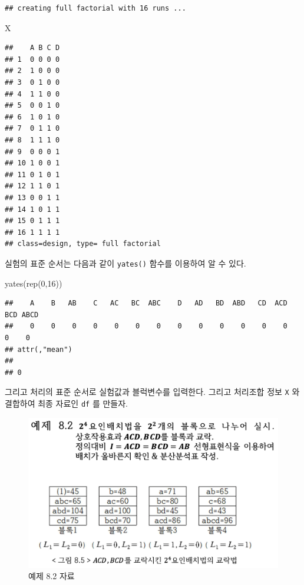 \documentclass[
]{book}
\newenvironment{Shaded}{\begin{snugshade}}{\end{snugshade}}
\newcommand{\DecValTok}[1]{\textcolor[rgb]{0.00,0.00,0.81}{#1}}
\newcommand{\FunctionTok}[1]{\textcolor[rgb]{0.00,0.00,0.00}{#1}}
\newcommand{\NormalTok}[1]{#1}
\begin{document}
\begin{verbatim}
## creating full factorial with 16 runs ...
\end{verbatim}

\begin{Shaded}
\begin{Highlighting}[]
\NormalTok{X}
\end{Highlighting}
\end{Shaded}

\begin{verbatim}
##    A B C D
## 1  0 0 0 0
## 2  1 0 0 0
## 3  0 1 0 0
## 4  1 1 0 0
## 5  0 0 1 0
## 6  1 0 1 0
## 7  0 1 1 0
## 8  1 1 1 0
## 9  0 0 0 1
## 10 1 0 0 1
## 11 0 1 0 1
## 12 1 1 0 1
## 13 0 0 1 1
## 14 1 0 1 1
## 15 0 1 1 1
## 16 1 1 1 1
## class=design, type= full factorial
\end{verbatim}

실험의 표준 순서는 다음과 같이 \texttt{yates()} 함수를 이용하여 알 수 있다.

\begin{Shaded}
\begin{Highlighting}[]
\FunctionTok{yates}\NormalTok{(}\FunctionTok{rep}\NormalTok{(}\DecValTok{0}\NormalTok{,}\DecValTok{16}\NormalTok{))}
\end{Highlighting}
\end{Shaded}

\begin{verbatim}
##    A    B   AB    C   AC   BC  ABC    D   AD   BD  ABD   CD  ACD  BCD ABCD 
##    0    0    0    0    0    0    0    0    0    0    0    0    0    0    0 
## attr(,"mean")
##   
## 0
\end{verbatim}

그리고 처리의 표준 순서로 실험값과 블럭변수를 입력한다. 그리고 처리조합 정보 \texttt{X} 와 결합하여 최종 자료인 \texttt{df} 를 만들자.

\begin{figure}

{\centering \includegraphics[width=0.8\linewidth]{images/ex82} 

}

\caption{예제 8.2 자료}\label{fig:unnamed-chunk-4}
\end{figure}
\end{document}
